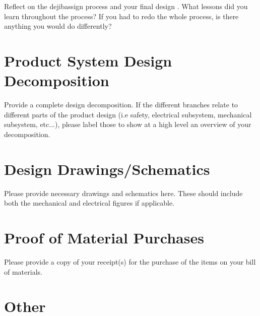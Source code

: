 \documentclass{other/docTemplate}
\begin{document}
Reflect on the dejibassign \cite{gelman2013bayesian} process and your final design \cite{lindquist2008statistical}. What lessons did you learn throughout the process? If you had to redo the whole process, is there anything you would do differently? 


\clearpage
  

\clearpage
\appendix
 \renewcommand{\thesection}{\Alph{section}.}
\setcounter{section}{0}

\section{Product System Design Decomposition}
Provide a complete design decomposition. If the different branches relate to different parts of the product design (i.e safety, electrical subsystem, mechanical subsystem, etc...), please label those to show at a high level an overview of your decomposition. 




\clearpage
\section{Design Drawings/Schematics}
Please provide necessary drawings and schematics here. These should include both the mechanical and electrical figures if applicable. 


\clearpage
\section{Proof of Material Purchases}
Please provide a copy of your receipt(s) for the purchase of the items on your bill of materials. 

\clearpage
\section{Other}
\end{document}
